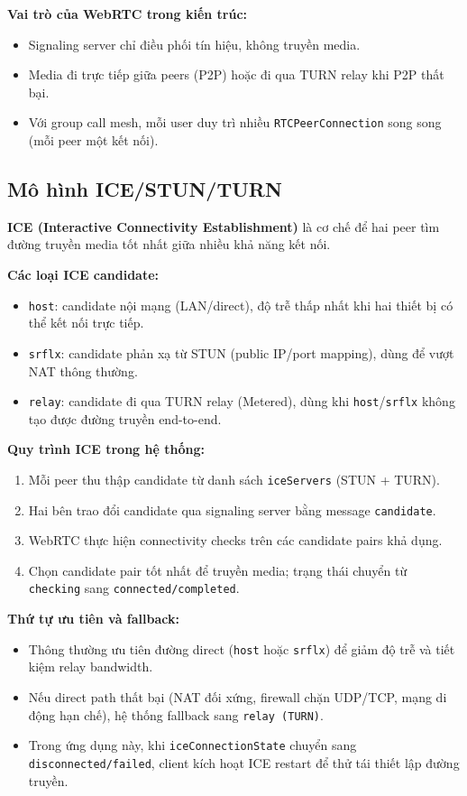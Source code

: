 \documentclass[12pt,a4paper]{article}
\begin{document}
\textbf{Vai trò của WebRTC trong kiến trúc:}
\begin{itemize}[leftmargin=1.5em]
  \item Signaling server chỉ điều phối tín hiệu, không truyền media.
  \item Media đi trực tiếp giữa peers (P2P) hoặc đi qua TURN relay khi P2P thất bại.
  \item Với group call mesh, mỗi user duy trì nhiều \texttt{RTCPeerConnection} song song (mỗi peer một kết nối).
\end{itemize}

\subsection{Mô hình ICE/STUN/TURN}
\textbf{ICE (Interactive Connectivity Establishment)} là cơ chế để hai peer tìm đường truyền media tốt nhất giữa nhiều khả năng kết nối.

\textbf{Các loại ICE candidate:}
\begin{itemize}[leftmargin=1.5em]
  \item \texttt{host}: candidate nội mạng (LAN/direct), độ trễ thấp nhất khi hai thiết bị có thể kết nối trực tiếp.
  \item \texttt{srflx}: candidate phản xạ từ STUN (public IP/port mapping), dùng để vượt NAT thông thường.
  \item \texttt{relay}: candidate đi qua TURN relay (Metered), dùng khi \texttt{host}/\texttt{srflx} không tạo được đường truyền end-to-end.
\end{itemize}

\textbf{Quy trình ICE trong hệ thống:}
\begin{enumerate}[leftmargin=1.8em]
  \item Mỗi peer thu thập candidate từ danh sách \texttt{iceServers} (STUN + TURN).
  \item Hai bên trao đổi candidate qua signaling server bằng message \texttt{candidate}.
  \item WebRTC thực hiện connectivity checks trên các candidate pairs khả dụng.
  \item Chọn candidate pair tốt nhất để truyền media; trạng thái chuyển từ \texttt{checking} sang \texttt{connected/completed}.
\end{enumerate}

\textbf{Thứ tự ưu tiên và fallback:}
\begin{itemize}[leftmargin=1.5em]
  \item Thông thường ưu tiên đường direct (\texttt{host} hoặc \texttt{srflx}) để giảm độ trễ và tiết kiệm relay bandwidth.
  \item Nếu direct path thất bại (NAT đối xứng, firewall chặn UDP/TCP, mạng di động hạn chế), hệ thống fallback sang \texttt{relay (TURN)}.
  \item Trong ứng dụng này, khi \texttt{iceConnectionState} chuyển sang \texttt{disconnected/failed}, client kích hoạt ICE restart để thử tái thiết lập đường truyền.
\end{itemize}
\end{document}
